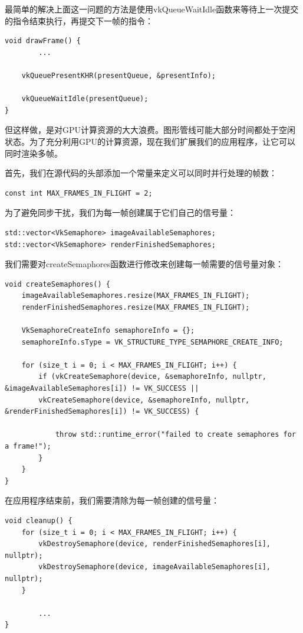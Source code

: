 \documentclass{ctexart}
\begin{document}
最简单的解决上面这一问题的方法是使用vkQueueWaitIdle函数来等待上一次提交的指令结束执行，再提交下一帧的指令：

\begin{lstlisting}[language={[ANSI]C}]
void drawFrame() {
		...

	vkQueuePresentKHR(presentQueue, &presentInfo);

	vkQueueWaitIdle(presentQueue);
}
\end{lstlisting}

但这样做，是对GPU计算资源的大大浪费。图形管线可能大部分时间都处于空闲状态。为了充分利用GPU的计算资源，现在我们扩展我们的应用程序，让它可以同时渲染多帧。

首先，我们在源代码的头部添加一个常量来定义可以同时并行处理的帧数：

\begin{lstlisting}[language={[ANSI]C}]
const int MAX_FRAMES_IN_FLIGHT = 2;
\end{lstlisting}

为了避免同步干扰，我们为每一帧创建属于它们自己的信号量：

\begin{lstlisting}[language={[ANSI]C}]
std::vector<VkSemaphore> imageAvailableSemaphores;
std::vector<VkSemaphore> renderFinishedSemaphores;
\end{lstlisting}

我们需要对createSemaphores函数进行修改来创建每一帧需要的信号量对象：

\begin{lstlisting}[language={[ANSI]C}]
void createSemaphores() {
	imageAvailableSemaphores.resize(MAX_FRAMES_IN_FLIGHT);
	renderFinishedSemaphores.resize(MAX_FRAMES_IN_FLIGHT);

	VkSemaphoreCreateInfo semaphoreInfo = {};
	semaphoreInfo.sType = VK_STRUCTURE_TYPE_SEMAPHORE_CREATE_INFO;

	for (size_t i = 0; i < MAX_FRAMES_IN_FLIGHT; i++) {
		if (vkCreateSemaphore(device, &semaphoreInfo, nullptr, &imageAvailableSemaphores[i]) != VK_SUCCESS ||
		vkCreateSemaphore(device, &semaphoreInfo, nullptr, &renderFinishedSemaphores[i]) != VK_SUCCESS) {

			throw std::runtime_error("failed to create semaphores for a frame!");
		}
	}
}
\end{lstlisting}

在应用程序结束前，我们需要清除为每一帧创建的信号量：

\begin{lstlisting}[language={[ANSI]C}]
void cleanup() {
	for (size_t i = 0; i < MAX_FRAMES_IN_FLIGHT; i++) {
		vkDestroySemaphore(device, renderFinishedSemaphores[i], nullptr);
		vkDestroySemaphore(device, imageAvailableSemaphores[i], nullptr);
	}

		...
}
\end{lstlisting}
\end{document}
